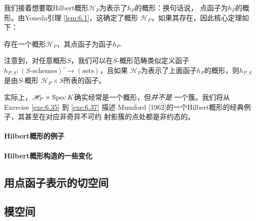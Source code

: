 我们接着想要取Hilbert概形$\mathscr H_P$为表示了$h_P$的概形：换句话说，
点函子为$h_P$的概形。由Yoneda引理 \eqref{lem:6.1}，这确定了概形
$\mathscr H_P$，如果其存在，因此核心定理如下：


\begin{thm}\label{thm:6.22}
存在一个概形$\mathscr H_P$，其点函子为函子$h_P$.
\end{thm}

注意到，对任意概形$S$，我们可以在$S$-概形范畴类似定义函子
$h_{P,S}:(\text{$S$-schemes})^\circ \to (\text{sets})$，且如果
$\mathscr H_P$为表示了上面函子$h_P$的概形，则$h_{P,S}$是由$S$-概形
$\mathscr H_P\times S$所表的函子。

实际上，$\mathscr H_P\times \operatorname{Spec} K$确实经常是一个概形，但\emph{并不是}
一个簇。我们将从 Exercise \ref{exe:6.35} 到 \ref{exe:6.37} 描述
Mumford [1962]的一个Hilbert概形的经典例子，其甚至在对应非奇异不可约
射影簇的点处都是非约态的。

\paragraph*{Hilbert概形的例子}

\paragraph*{Hilbert概形构造的一些变化}

\subsection{用点函子表示的切空间}\label{s:6.2.3}
\subsection{模空间}\label{s:6.2.4}
